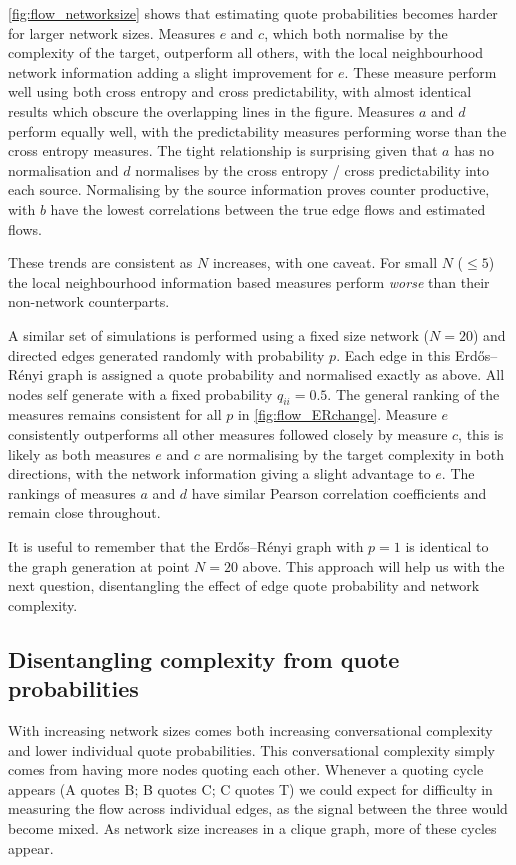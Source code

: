 \autoref{fig:flow_networksize} shows that estimating quote probabilities becomes harder for larger network sizes. %
Measures $e$ and $c$, which both normalise by the complexity of the target, outperform all others, with the local neighbourhood network information adding a slight improvement for $e$. These measure perform well using both cross entropy and cross predictability, with almost identical results which obscure the overlapping lines in the figure. Measures $a$ and $d$ perform equally well, with the predictability measures performing worse than the cross entropy measures. The tight relationship is surprising given that $a$ has no normalisation and $d$ normalises by the cross entropy / cross predictability into each source. Normalising by the source information proves counter productive, with $b$ have the lowest correlations between the true edge flows and estimated flows.

These trends are consistent as $N$ increases, with one caveat. For small $N$ ($\leq 5$) the local neighbourhood information based measures perform \emph{worse} than their non-network counterparts. %

A similar set of simulations is performed using a fixed size network ($N=20$) and directed edges generated randomly with probability $p$. Each edge in this Erdős–Rényi graph is assigned a quote probability and normalised exactly as above. All nodes self generate with a fixed probability $q_{ii}=0.5$. The general ranking of the measures remains consistent for all $p$ in \autoref{fig:flow_ERchange}. Measure $e$ consistently outperforms all other measures followed closely by measure $c$, this is likely as both measures $e$ and $c$ are normalising by the target complexity in both directions, with the network information giving a slight advantage to $e$. The rankings of measures $a$ and $d$ have similar Pearson correlation coefficients and remain close throughout. 

It is useful to remember that the Erdős–Rényi graph with $p=1$ is identical to the graph generation at point $N=20$ above. This approach will help us with the next question, disentangling the effect of edge quote probability and network complexity.   

\subsection{Disentangling complexity from quote probabilities}\label{sec:low_quote_probs}
With increasing network sizes comes both increasing conversational complexity and lower individual quote probabilities. This conversational complexity simply comes from having more nodes quoting each other. Whenever a quoting cycle appears (A quotes B; B quotes C; C quotes T) we could expect for difficulty in measuring the flow across individual edges, as the signal between the three would become mixed. As network size increases in a clique graph, more of these cycles appear.  

